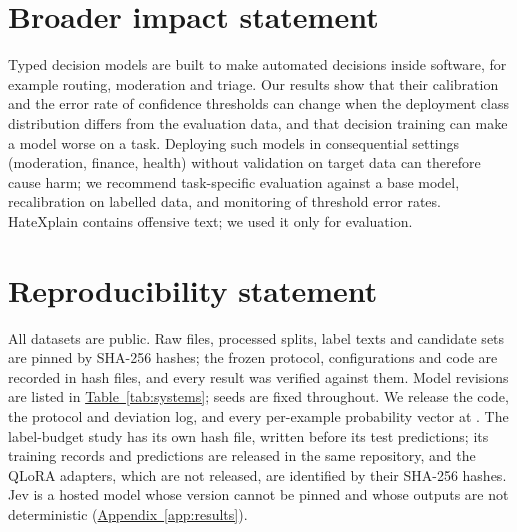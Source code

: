 \section*{Broader impact statement}
Typed decision models are built to make automated decisions inside software, for example routing, moderation and
triage. Our results show that their calibration and the error rate of confidence thresholds can change when the
deployment class distribution differs from the evaluation data, and that decision training can make a model worse on a
task. Deploying such models in consequential settings (moderation, finance, health) without validation on target data
can therefore cause harm; we recommend task-specific evaluation against a base model, recalibration on labelled data,
and monitoring of threshold error rates. HateXplain contains offensive text; we used it only for evaluation.

\section*{Reproducibility statement}
All datasets are public. Raw files, processed splits, label texts and candidate sets are pinned by SHA-256 hashes; the
frozen protocol, configurations and code are recorded in hash files, and every result was verified against them. Model
revisions are listed in \hyperref[tab:systems]{Table~\ref*{tab:systems}}; seeds are fixed throughout. We release the code, the protocol and
deviation log, and every per-example probability vector at
\anonrepo. The label-budget study has its own hash file, written
before its test predictions; its training records and predictions are released in the same repository, and the QLoRA
adapters, which are not released, are identified by their SHA-256 hashes. Jev is a hosted model whose version
cannot be pinned and whose outputs are not deterministic (\hyperref[app:results]{Appendix~\ref*{app:results}}).
